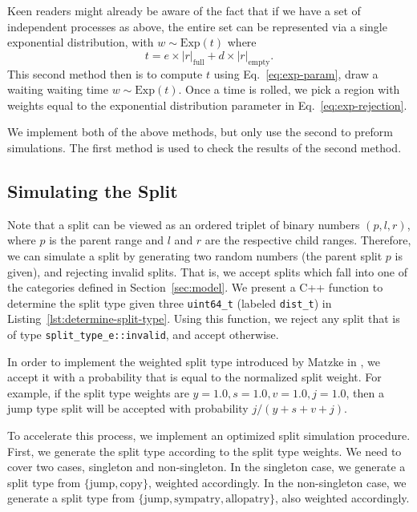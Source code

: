 \documentclass[a4paper]{article}
\newcommand{\CountFull}[1]{|#1|_\text{full}}
\newcommand{\CountEmpty}[1]{|#1|_\text{empty}}
\begin{document}
Keen readers might already be aware of the fact that if we have a set of
independent processes as above, the entire set can be represented via a single
exponential distribution, with \(w \sim \text{Exp}(t) \) where
\begin{equation}
	\label{eq:exp-param} t = e \times \CountFull{r} + d \times \CountEmpty{r}.
\end{equation}
This second method then is to compute \( t \) using Eq.~\ref{eq:exp-param},
draw a waiting waiting time \( w \sim \text{Exp}(t) \).
Once a time is rolled, we pick a region with weights equal to the exponential
distribution parameter in Eq.~\ref{eq:exp-rejection}.

We implement both of the above methods, but only use the second to preform
simulations.
The first method is used to check the results of the second method.

\subsection{Simulating the Split}

Note that a split can be viewed as an ordered triplet of binary numbers \(
(p,l,r) \), where $p$ is the parent range and $l$ and $r$ are the respective child ranges.
Therefore, we can simulate a split by generating two random numbers (the parent
split $p$ is given), and rejecting invalid splits.
That is, we accept splits which fall into one of the categories defined in
Section~\ref{sec:model}.
We present a C++ function to determine the split type given three
\texttt{uint64_t} (labeled \texttt{dist_t}) in
Listing~\ref{lst:determine-split-type}.
Using this function, we reject any split that is of type
\texttt{split_type_e::invalid}, and accept otherwise.

In order to implement the weighted split type introduced by Matzke in
\cite{ModelSelectionMatzke2014}, we accept it with a probability that is equal to the
normalized split weight.
For example, if the split type weights are $y = 1.0, s = 1.0, v = 1.0, j=1.0$,
then a jump type split will be accepted with probability $j/(y + s + v +
j)$.

To accelerate this process, we implement an optimized split
simulation procedure.
First, we generate the split type according to the split type weights.
We need to cover two cases, singleton and non-singleton.
In the singleton case, we generate a split type from $\{\text{jump},
\text{copy}\}$, weighted accordingly.
In the non-singleton case, we generate a split type from $\{\text{jump},
\text{sympatry}, \text{allopatry}\}$, also weighted accordingly.
\end{document}
